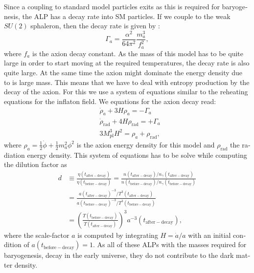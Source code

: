 \documentclass[master,       %
               twoside,        %
               BCOR10mm,       %
               english,ngerman, %
               ]{GAUBM}
\newcommand{\todo}[1]{{\color{magenta}{#1}}}
\begin{document}
\begin{otherlanguage}{english}
\begin{figure}[H]
\end{figure}
Since a coupling to standard model particles exits as this is required for baryogenesis, the ALP has a decay rate into SM particles. If we couple to the weak $SU(2)$ sphaleron, then the decay rate is given by \cite[eq. 15]{Kusenko_2015_Axion_Leptogenesis}:
\begin{equation}
	\Gamma_a = \frac{\alpha^2}{64\pi^2} \frac{m_a^3}{f_a^2},
\end{equation}
where $f_a$ is the axion decay constant.
\todo{TODO: this is wrong in the code. All couplings use the same decay rate rate namely this one!!!!!!!!!!!!!!!!!!!!!!!!!!!!!!}
As the mass of this model has to be quite large in order to start moving at the required temperatures, the decay rate is also quite large.
At the same time the axion might dominate the energy density due to is large mass. This means that we have to deal with entropy production by the decay of the axion.
For this we use a system of equations similar to the reheating equations for the inflaton field. We equations for the axion decay read:
\begin{align}
	&\dot{\rho}_a + 3 H \rho_a = - \Gamma_a \nonumber \\
	&\dot{\rho}_\mathrm{rad} + 4 H \rho_\mathrm{rad} = + \Gamma_a \nonumber \\
	&3 M_\mathrm{pl}^3 H^2 = \rho_a + \rho_\mathrm{rad},
\end{align}
where $\rho_a = \frac{1}{2} \dot{\phi} + \frac{1}{2} m_a^2 \phi^2$ is the axion energy density for this model and $\rho_\mathrm{rad}$ the radiation energy density.
This system of equations has to be solve while computing the dilution factor as
\begin{align}
	d &\equiv \frac{\eta(t_\mathrm{after-decay})}{\eta(t_\mathrm{before-decay})} = \frac{n(t_\mathrm{after-decay}) / n_\gamma(t_\mathrm{after-decay})}{n(t_\mathrm{before-decay}) / n_\gamma(t_\mathrm{before-decay})} \nonumber \\
	&= \frac{a(t_\mathrm{after-decay})^{-3} / T^3(t_\mathrm{after-decay})}{a(t_\mathrm{before-decay})^{-3} / T^3(t_\mathrm{before-decay})} \nonumber \\
	&= \left( \frac{T(t_\mathrm{before-decay})}{T(t_\mathrm{after-decay})} \right)^3 a^{-3}(t_\mathrm{after-decay}),
\end{align}
where the scale-factor $a$ is computed by integrating $H = \dot{a} / a$ with an initial condition of $a(t_\mathrm{before-decay}) = 1$.
As all of these ALPs with the masses required for baryogenesis, decay in the early universe, they do not contribute to the dark matter density.


\end{otherlanguage}
\end{document}

